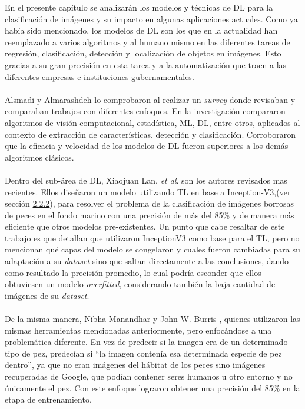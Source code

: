 En el presente capítulo se analizarán los modelos y técnicas de DL 
para la clasificación de imágenes y su impacto en algunas aplicaciones 
actuales. Como ya había sido mencionado, los modelos de DL son los que 
en la actualidad han reemplazado a varios algoritmos y al humano mismo 
en las diferentes tareas de regresión, clasificación, detección y 
localización de objetos en imágenes. Esto gracias a su gran precisión 
en esta tarea y a la automatización que traen a las diferentes empresas 
e instituciones gubernamentales. \\\\

Alsmadi y Almarashdeh \cite{Alsmadi2022} lo comprobaron al realizar un 
\textit{survey} donde revisaban y comparaban trabajos con diferentes 
enfoques. En la investigación compararon algoritmos de visión 
computacional, estadística, ML, DL, entre otros, aplicados al contexto de 
extracción de características, detección y clasificación. Corroboraron 
que la eficacia y velocidad de los modelos de DL fueron superiores 
a los demás algoritmos clásicos.\\\\

Dentro del sub-área de DL, Xiaojuan Lan, \textit{et al}.\cite{10.1145/3419635.3419643} 
son los autores revisados mas recientes. Ellos diseñaron un modelo utilizando TL en 
base a Inception-V3,(ver sección \hyperref[sec:inceptionV3]{2.2.2}), para resolver el 
problema de la clasificación de imágenes borrosas de peces en el fondo marino con una 
precisión de más del 85\% y de manera más eficiente que otros modelos pre-existentes. 
Un punto que cabe resaltar de este trabajo es que detallan que utilizaron 
InceptionV3 como base para el TL, pero no mencionan qué capas del modelo se congelaron y 
cuales fueron cambiadas para su adaptación a su \textit{dataset} sino que saltan directamente 
a las conclusiones, dando como resultado la precisión promedio, lo cual podría esconder 
que ellos obtuviesen un modelo \textit{overfitted}, considerando también la baja cantidad 
de imágenes de su \textit{dataset}. \\\\

De la misma manera, Nibha Manandhar y John W. Burris \cite{10.1145/3325917.3325934}, 
quienes utilizaron las mismas herramientas mencionadas anteriormente, pero enfocándose a 
una problemática diferente. En vez de predecir si la imagen era de un determinado tipo de 
pez, predecían si ``la imagen contenía esa determinada especie de pez dentro'', ya 
que no eran imágenes del hábitat de los peces sino imágenes recuperadas de Google, que 
podían contener seres humanos u otro entorno y no únicamente el pez. Con este enfoque lograron 
obtener una precisión del 85\% en la etapa de entrenamiento. \\\\


